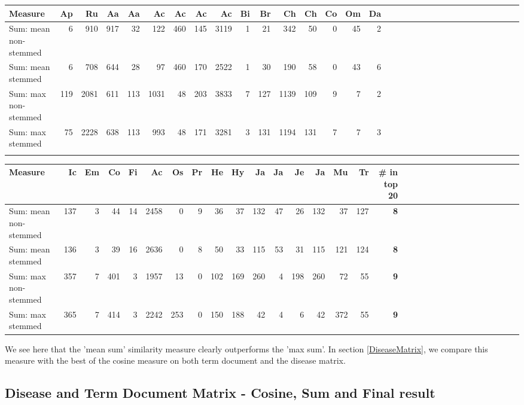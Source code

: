 \begin{table}[H]
\begin{tiny}
  \begin{tabular}{|l|r|r|r|r|r|r|r|r|r|r|r|r|r|r|r|r|r|r|r|r|r|r|r|r|r|r|r|r|r|r|r|}
    \hline
    Measure &Ap&Ru&Aa&Aa&Ac&Ac&Ac&Ac&Bi&Br&Ch&Ch&Co&Om&Da\\
    \hline
    Sum: mean non-stemmed &6&910&917&32&122&460&145&3119&1&21&342&50&0&45&2\\
    \hline
    Sum: mean stemmed &6&708&644&28&97&460&170&2522&1&30&190&58&0&43&6\\
    \hline
    Sum: max non-stemmed &119&2081&611&113&1031&48&203&3833&7&127&1139&109&9&7&2\\
    \hline
    Sum: max stemmed &75&2228&638&113&993&48&171&3281&3&131&1194&131&7&7&3 \\
    \hline
    \multicolumn{16}{c}{} \\
    \end{tabular}
    \begin{tabular}{|l|r|r|r|r|r|r|r|r|r|r|r|r|r|r|r|r|r|r|r|r|r|r|r|r|r|r|r|r|r|r|}
    \hline
     Measure &Ic&Em&Co&Fi&Ac&Os&Pr&He&Hy&Ja&Ja&Je&Ja&Mu&Tr &\scriptsize{\textbf{\# in top 20}} \\
    \hline
    Sum: mean non-stemmed &137&3&44&14&2458&0&9&36&37&132&47&26&132&37&127 & \scriptsize{\textbf{8}} \\
    \hline
    Sum: mean stemmed &136&3&39&16&2636&0&8&50&33&115&53&31&115&121&124 & \scriptsize{\textbf{8}} \\
    \hline
    Sum: max non-stemmed &357&7&401&3&1957&13&0&102&169&260&4&198&260&72&55 & \scriptsize{\textbf{9}} \\
    \hline
    Sum: max stemmed &365&7&414&3&2242&253&0&150&188&42&4&6&42&372&55 & \scriptsize{\textbf{9}} \\
    \hline
  \end{tabular}
\end{tiny}
\end{table}

We see here that the 'mean sum' similarity measure clearly outperforms the 'max sum'. 
In section \ref{DiseaseMatrix}, we compare this measure with the best of the cosine 
measure on both term document and the disease matrix.

\subsection{Disease and Term Document Matrix - Cosine, Sum and Final result}

